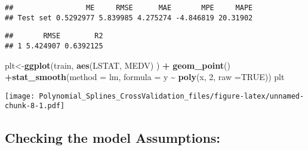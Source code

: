 \documentclass[
]{article}
\newenvironment{Shaded}{\begin{snugshade}}{\end{snugshade}}
\newcommand{\AttributeTok}[1]{\textcolor[rgb]{0.13,0.29,0.53}{#1}}
\newcommand{\CommentTok}[1]{\textcolor[rgb]{0.56,0.35,0.01}{\textit{#1}}}
\newcommand{\ConstantTok}[1]{\textcolor[rgb]{0.56,0.35,0.01}{#1}}
\newcommand{\DecValTok}[1]{\textcolor[rgb]{0.00,0.00,0.81}{#1}}
\newcommand{\FunctionTok}[1]{\textcolor[rgb]{0.13,0.29,0.53}{\textbf{#1}}}
\newcommand{\NormalTok}[1]{#1}
\newcommand{\OtherTok}[1]{\textcolor[rgb]{0.56,0.35,0.01}{#1}}
\newcommand{\SpecialCharTok}[1]{\textcolor[rgb]{0.81,0.36,0.00}{\textbf{#1}}}
\begin{document}
\begin{Shaded}
\end{Shaded}

\begin{verbatim}
##                 ME     RMSE      MAE       MPE     MAPE
## Test set 0.5292977 5.839985 4.275274 -4.846819 20.31902
\end{verbatim}

\begin{Shaded}
\end{Shaded}

\begin{verbatim}
##       RMSE        R2
## 1 5.424907 0.6392125
\end{verbatim}

\begin{Shaded}
\begin{Highlighting}[]
\NormalTok{plt}\OtherTok{\textless{}{-}}\FunctionTok{ggplot}\NormalTok{(train, }\FunctionTok{aes}\NormalTok{(LSTAT, MEDV) ) }\SpecialCharTok{+} \FunctionTok{geom\_point}\NormalTok{() }\SpecialCharTok{+}\FunctionTok{stat\_smooth}\NormalTok{(}\AttributeTok{method =}\NormalTok{ lm, }\AttributeTok{formula =}\NormalTok{ y }\SpecialCharTok{\textasciitilde{}} \FunctionTok{poly}\NormalTok{(x, }\DecValTok{2}\NormalTok{, }\AttributeTok{raw =}\ConstantTok{TRUE}\NormalTok{))}
\NormalTok{plt}
\end{Highlighting}
\end{Shaded}

\texttt{[image: Polynomial\_Splines\_CrossValidation\_files/figure-latex/unnamed-chunk-8-1.pdf]}

\hypertarget{checking-the-model-assumptions}{%
\subsection{Checking the model
Assumptions:}\label{checking-the-model-assumptions}}
\end{document}
